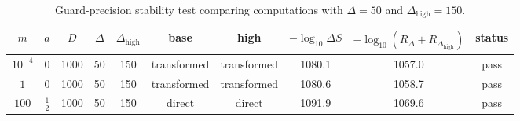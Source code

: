 \begin{table}[t]
\centering
\small
\begin{tabular}{c c c c c c c c c c}
\hline
$m$ & $a$ & $D$ & $\Delta$ & $\Delta_{\mathrm{high}}$ & base & high & $-\log_{10}\Delta S$ & $-\log_{10}(R_\Delta+R_{\Delta_{\mathrm{high}}})$ & status \\
\hline
$10^{-4}$ & $0$ & 1000 & 50 & 150 & transformed & transformed & 1080.1 & 1057.0 & pass \\
$1$ & $0$ & 1000 & 50 & 150 & transformed & transformed & 1080.6 & 1058.7 & pass \\
$100$ & $\frac12$ & 1000 & 50 & 150 & direct & direct & 1091.9 & 1069.6 & pass \\
\hline
\end{tabular}
\caption{Guard-precision stability test comparing computations with $\Delta=50$ and $\Delta_{\mathrm{high}}=150$.}
\label{tab:guard-stability}
\end{table}
